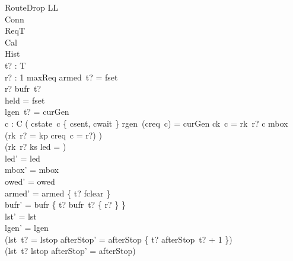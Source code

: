 \documentclass[a4paper,10pt,fleqn]{article}
\begin{document}
\begin{schema}{RouteDrop}
  \Delta LL \\
  \Xi Conn \\
  \Xi ReqT \\
  \Xi Cal \\
  \Xi Hist \\
  t? : T \\
  r? : 1 \upto maxReq
\where
  armed~t? = fset \\
  r? \in bufr~t? \\
  held = fset \\
  lgen~t? = curGen \\
  \forall c : C \spot \lnot ( cstate~c \in \{ csent, cwait \}
    \land rgen~(creq~c) = curGen \land ck~c = rk~r? \land c \notin \dom mbox
    \land (rk~r? = kp \implies creq~c = r?)
    ) \\
  (rk~r? \neq ks \lor led = \emptyset) \\
  led' = led \\
  mbox' = mbox \\
  owed' = owed \\
  armed' = armed \oplus \{ t? \mapsto fclear \} \\
  bufr' = bufr \oplus \{ t? \mapsto bufr~t? \setminus \{ r? \} \} \\
  lst' = lst \\
  lgen' = lgen \\
  (lst~t? = lstop \implies
    afterStop' = afterStop \oplus \{ t? \mapsto afterStop~t? + 1 \}) \\
  (lst~t? \neq lstop \implies afterStop' = afterStop)
\end{schema}
\end{document}
